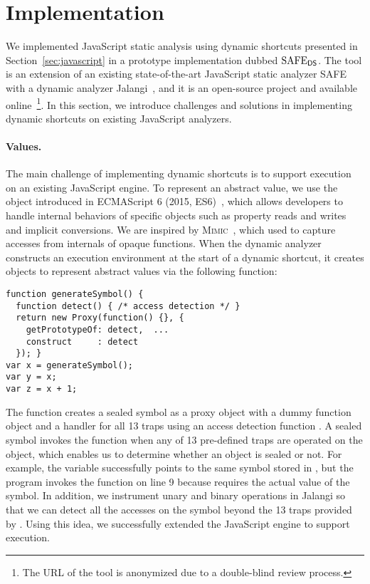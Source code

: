 \section{Implementation}\label{sec:implementation}
We implemented JavaScript static analysis using dynamic shortcuts
presented in Section~\ref{sec:javascript} in a prototype implementation dubbed
$\text{SAFE}_{\textsf{DS}}$.  The tool is an extension of an existing state-of-the-art JavaScript
static analyzer SAFE~\cite{safe, safe2} with a dynamic analyzer
Jalangi~\cite{jalangi}, and it is an open-source project and available online~\footnote{The
URL of the tool is anonymized due to a double-blind review process.}.  In this
section, we introduce challenges and solutions in implementing dynamic
shortcuts on existing JavaScript analyzers.

\paragraph{{\SealeD} Values.}
The main challenge of implementing dynamic shortcuts is to support {\sealed} execution on an existing JavaScript engine.  To represent an abstract
value, we use the  object introduced in ECMAScript 6
(2015, ES6)~\cite{es6}, which allows developers to handle internal behaviors
of specific objects such as property reads and writes and implicit conversions.
We are inspired by \textsc{Mimic}~\cite{mimic}, which used  to
capture accesses from internals of opaque functions.  When the dynamic analyzer
constructs an execution environment at the start of a dynamic shortcut, it
creates  objects to represent abstract values via the
following  function:
\begin{lstlisting}[style=myJSstyle]
function generateSymbol() {
  function detect() { /* access detection */ }
  return new Proxy(function() {}, {
    getPrototypeOf: detect,  ...
    construct     : detect
  }); }
var x = generateSymbol();
var y = x;
var z = x + 1;
\end{lstlisting}
The function creates a sealed symbol as a proxy object with a dummy
function object and a handler for all 13 traps using an access detection
function .  A sealed symbol invokes the function 
when any of 13 pre-defined traps are operated on the object, which enables us to
determine whether an object is sealed or not.  For example, the variable
 successfully points to the same symbol stored in , but the
program invokes the function  on line 9 because  requires
the actual value of the symbol.  In addition, we instrument unary and binary
operations in Jalangi so that we can detect all the accesses on the
symbol beyond the 13 traps provided by .
Using this idea, we successfully extended the
JavaScript engine to support {\sealed} execution.

